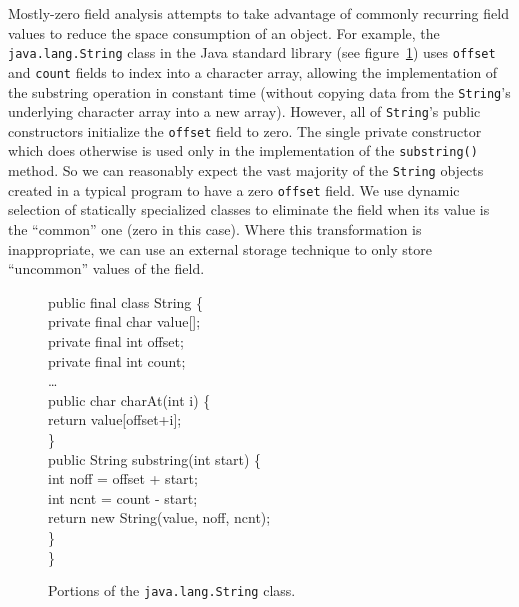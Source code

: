 \documentclass[preprint]{acmconf}
\begin{document}
Mostly-zero field analysis attempts to take advantage of commonly
recurring field values to reduce the space consumption of an object.
For example, the {\tt java.lang.String} class in the Java standard
library (see figure~\ref{fig:string-fields}) uses {\tt offset} and
{\tt count} fields to index into a character array, allowing the
implementation of the substring operation in constant time (without
copying data from the {\tt String}'s underlying character array into a
new array).  However, all of {\tt String}'s public constructors
initialize the {\tt offset} field to zero.  The single private
constructor which does otherwise is used only in the implementation of
the {\tt substring()} method.  So we can reasonably expect the vast
majority of the {\tt String} objects created in a typical program to
have a zero {\tt offset} field.  We use dynamic selection of
statically specialized classes to eliminate the field when its value
is the ``common'' one (zero in this case).  Where this transformation
is inappropriate, we
can use an external storage technique to only store ``uncommon''
values of the field.
\begin{figure}
\begin{samplecode}
public final class String \{\\
\>private final char value[];\\
\>private final int offset;\\
\>private final int count;\\
\>\ldots\\
\>public char charAt(int i) \{\\
\>\>return value[offset+i];\\
\>\}\\
\>public String substring(int start) \{\\
\>\>int noff = offset + start;\\
\>\>int ncnt = count - start;\\
\>\>return new String(value, noff, ncnt);\\
\>\}\\
\}\\
\end{samplecode}
\caption{Portions of the {\tt java.lang.String} class.}
\label{fig:string-fields}
\end{figure}
\end{document}
